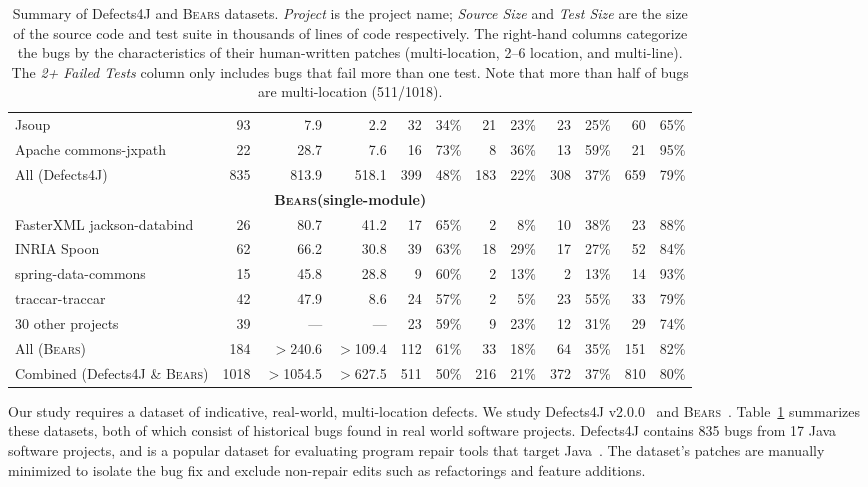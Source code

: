 \documentclass[10pt, conference]{IEEEtran}
\newcommand\bears{\textsc{Bears}\xspace}
\begin{document}
\begin{table}
\begin{center}
\begin{tabular}{l  rrr | rr rr rr rr }
Jsoup & 93 & 7.9 & 2.2 & 32 & 34\% & 21 & 23\% & 23 & 25\% & 60 & 65\% \\
Apache commons-jxpath & 22 & 28.7 & 7.6 & 16 & 73\% & 8 & 36\% & 13 & 59\% & 21 & 95\% \\
\midrule
All (Defects4J) & 835 & 813.9 & 518.1 & 399 & 48\% & 183 & 22\% & 308 & 37\% & 659 & 79\%\\
\midrule
\multicolumn{12}{c}{\textbf{\bears (single-module)}} \\
\midrule
FasterXML jackson-databind & 26 & 80.7 & 41.2 & 17 & 65\% & 2 & 8\% & 10 & 38\% & 23 & 88\% \\
INRIA Spoon & 62 & 66.2 & 30.8  & 39 & 63\% & 18 & 29\% & 17 & 27\% & 52 & 84\% \\
spring-data-commons & 15 & 45.8 & 28.8  & 9 & 60\% & 2 & 13\% & 2 & 13\% & 14 & 93\% \\
traccar-traccar & 42 & 47.9 & 8.6 & 24 & 57\% & 2 & 5\% & 23 & 55\% & 33 & 79\% \\
30 other projects & 39 & --- & --- & 23 & 59\% & 9 & 23\% & 12 & 31\% & 29 & 74\% \\
\midrule
All (\bears) & 184 & $>$240.6 & $>$109.4 & 112 & 61\% & 33 & 18\% & 64 & 35\% & 151 & 82\% \\
\midrule
Combined (Defects4J \& \bears) & 1018 & $>$1054.5 & $>$627.5 & 511 & 50\% & 216 & 21\% & 372 & 37\% & 810 & 80\%\\
\bottomrule
\end{tabular}
\end{center}
\caption{\label{tab:dataset-characteristics} Summary of Defects4J and \bears
  datasets. \emph{Project} is the project name; \emph{Source Size} and
  \emph{Test Size} are the size of the source code and test suite in thousands
  of lines of code respectively. The right-hand columns categorize the bugs by
  the characteristics of their human-written patches (multi-location, 2--6
  location, and multi-line). The \emph{2+ Failed Tests} column only includes
  bugs that fail more than one test. Note that more than half of bugs are
  multi-location (511/1018).  }
\end{table}

Our study requires a dataset of indicative, real-world,
multi-location defects.  We study 
Defects4J v2.0.0~\cite{defects4j} and \bears~\cite{bears}.  Table~\ref{tab:dataset-characteristics}
summarizes these datasets, both of which
consist of historical
bugs found in real world software projects. Defects4J contains 835 bugs from 
17 Java software projects, and is a popular dataset for evaluating 
program repair tools that target 
Java~\cite{durieux-repair-them-all,pearson2017evaluating,saha2017elixir,saha2019harnessing,xin2017leveraging,b2016learning}.
The dataset's patches are manually minimized to isolate the bug fix 
and exclude non-repair edits such as refactorings and feature additions.
\end{document}

